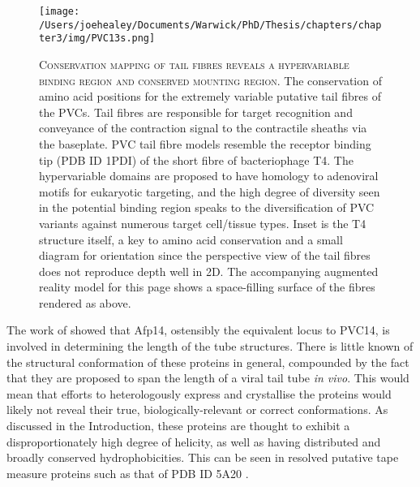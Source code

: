 \begin{landscape}
\begin{figure}[p]
 \centering
   \texttt{[image: /Users/joehealey/Documents/Warwick/PhD/Thesis/chapters/chapter3/img/PVC13s.png]}
 \captionsetup{singlelinecheck=off, justification=justified, font=footnotesize, aboveskip=10pt}
 \caption[Conservation mapping off putative tail fibre structures]{\textsc{\normalsize Conservation mapping of tail fibres reveals a hypervariable binding region and conserved mounting region.}\vspace{0.1cm} \newline The conservation of amino acid positions for the extremely variable putative tail fibres of the PVCs. Tail fibres are responsible for target recognition and conveyance of the contraction signal to the contractile sheaths via the baseplate. PVC tail fibre models resemble the receptor binding tip (PDB ID 1PDI) of the short fibre of bacteriophage T4. The hypervariable domains are proposed to have homology to adenoviral motifs for eukaryotic targeting, and the high degree of diversity seen in the potential binding region speaks to the diversification of PVC variants against numerous target cell/tissue types. Inset is the T4 structure itself, a key to amino acid conservation and a small diagram for orientation since the perspective view of the tail fibres does not reproduce depth well in 2D. The accompanying augmented reality model for this page shows a space-filling surface of the fibres rendered as above. }
 \label{fibre_models}
\end{figure}
\end{landscape}


The work of \cite{Rybakova2015} showed that Afp14, ostensibly the equivalent locus to PVC14, is involved in determining the length of the tube structures. There is little known of the structural conformation of these proteins in general, compounded by the fact that they are proposed to span the length of a viral tail tube \emph{in vivo}. This would mean that efforts to heterologously express and crystallise the proteins would likely not reveal their true, biologically-relevant or correct conformations. As discussed in the Introduction, these proteins are thought to exhibit a disproportionately high degree of helicity, as well as having distributed and broadly conserved hydrophobicities. This can be seen in resolved putative tape measure proteins such as that of PDB ID 5A20 \citep{Chaban2015}.

